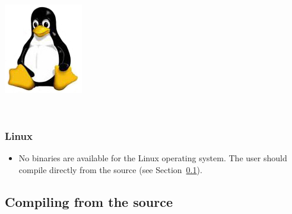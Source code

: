 \begin{flushleft}
	\begin{minipage}[c]{0.074\textwidth}
   		\includegraphics[width=\textwidth]{doc/figures/figlogolinux.jpg}
	\end{minipage}
	\,
	\begin{minipage}[t]{0.88\textwidth}
	   	\subsubsection*{Linux}
	\end{minipage}
		\begin{itemize}
			\item  No binaries are available for the Linux operating system.  The user should compile
			\poy directly from the source (see Section~\ref{Compilingfromsource}). 
		\end{itemize} 

\end{flushleft}

\subsection{Compiling from the source}
\label{Compilingfromsource}

